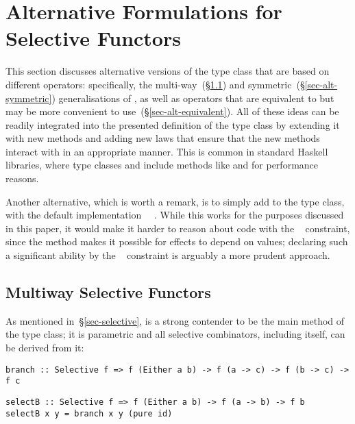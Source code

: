 \section{Alternative Formulations for Selective Functors}
\label{sec-alternatives}

This section discusses alternative versions of the  type class
that are based on different  operators: specifically, the
multi-way~(\S\ref{sec-alt-multi}) and symmetric~(\S\ref{sec-alt-symmetric})
generalisations of , as well as operators that are equivalent to
 but may be more convenient to use~(\S\ref{sec-alt-equivalent}). All
of these ideas can be readily integrated into the presented definition of the
 type class by extending it with new methods and adding new laws
that ensure that the new methods interact with  in an appropriate
manner. This is common in standard Haskell libraries, where type classes
 and  include methods like \hs{*>} and \hs{>>} for
performance reasons.

Another alternative, which is worth a remark, is to simply add  to
the  type class, with the default implementation
~\hs{=}~. While this works for the purposes discussed in
this paper, it would make it harder to reason about code with the
~ constraint, since the  method makes it
possible for effects to depend on values; declaring such a significant ability
by the ~ constraint is arguably a more prudent approach.

\subsection{Multiway Selective Functors}\label{sec-alt-multi}

As mentioned in~\S\ref{sec-selective},  is a strong contender to be
the main method of the  type class; it is parametric and all
selective combinators, including  itself, can be derived from it:

\vspace{1mm}
\begin{verbatim}
branch :: Selective f => f (Either a b) -> f (a -> c) -> f (b -> c) -> f c
\end{verbatim}
\vspace{0mm}
\begin{verbatim}
selectB :: Selective f => f (Either a b) -> f (a -> b) -> f b
selectB x y = branch x y (pure id)
\end{verbatim}
\vspace{1mm}

